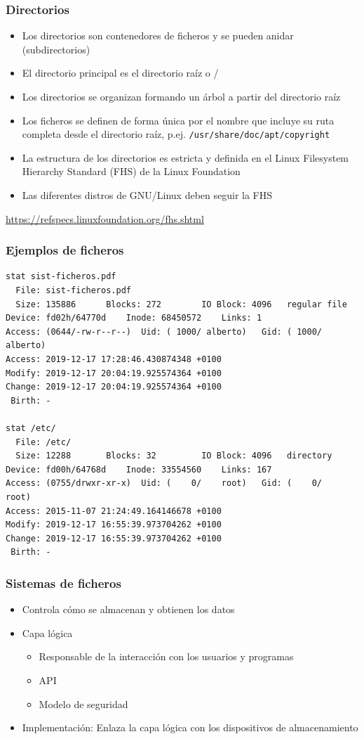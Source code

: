 \documentclass[aspectratio=169]{beamer}
\begin{document}
\begin{frame}
  \frametitle{Directorios}
  \begin{itemize}
  \item Los directorios son contenedores de ficheros y se pueden
    anidar (subdirectorios)
  \item El directorio principal es el directorio raíz o /
  \item Los directorios se organizan formando un árbol a partir del
    directorio raíz
  \item Los ficheros se definen de forma única por el nombre que
    incluye su ruta completa desde el directorio raíz,
    p.ej. \texttt{/usr/share/doc/apt/copyright}
  \item La estructura de los directorios es estricta y definida en el
    Linux Filesystem Hierarchy Standard (FHS) de la Linux Foundation
  \item Las diferentes distros de GNU/Linux deben seguir la FHS
  \end{itemize}
\small{\url{https://refspecs.linuxfoundation.org/fhs.shtml}}
\end{frame}

\begin{frame}[fragile]
  \frametitle{Ejemplos de ficheros}
  \begin{lstlisting}
stat sist-ficheros.pdf 
  File: sist-ficheros.pdf
  Size: 135886    	Blocks: 272        IO Block: 4096   regular file
Device: fd02h/64770d	Inode: 68450572    Links: 1
Access: (0644/-rw-r--r--)  Uid: ( 1000/ alberto)   Gid: ( 1000/ alberto)
Access: 2019-12-17 17:28:46.430874348 +0100
Modify: 2019-12-17 20:04:19.925574364 +0100
Change: 2019-12-17 20:04:19.925574364 +0100
 Birth: -

stat /etc/
  File: /etc/
  Size: 12288     	Blocks: 32         IO Block: 4096   directory
Device: fd00h/64768d	Inode: 33554560    Links: 167
Access: (0755/drwxr-xr-x)  Uid: (    0/    root)   Gid: (    0/    root)
Access: 2015-11-07 21:24:49.164146678 +0100
Modify: 2019-12-17 16:55:39.973704262 +0100
Change: 2019-12-17 16:55:39.973704262 +0100
 Birth: -
  \end{lstlisting}
\end{frame}

\begin{frame}
  \frametitle{Sistemas de ficheros}
  \begin{itemize}
  \item Controla cómo se almacenan y obtienen los datos
  \item Capa lógica
    \begin{itemize}
    \item Responsable de la interacción con los usuarios y programas
    \item API
    \item Modelo de seguridad
    \end{itemize}
  \item Implementación: Enlaza la capa lógica con los dispositivos de
    almacenamiento
  \end{itemize}
\end{frame}
\end{document}
